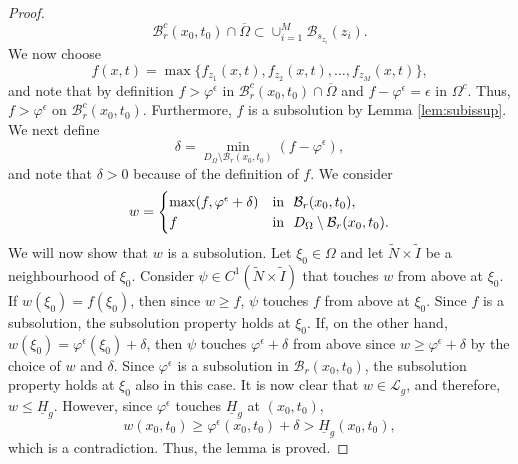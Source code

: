\documentclass[11pt]{article}
\providecommand{\Rnp}{D_{\Omega}}
\providecommand{\lps}{\underline{H}_g}
\providecommand{\lcg}{\mathcal{L}_g}
\numberwithin{equation}{section}
\theoremstyle{definition}
\begin{document}
\begin{proof}
    $$
    \mathcal{B}_{r}^c(x_0,t_0)  \cap \overline{\Omega} \subset \cup_{i=1}^M \mathcal{B}_{s_{z_i}}(z_i).
    $$
    We now choose
    \begin{equation*}
        f(x,t) = \max\{f_{z_1}(x,t), f_{z_2}(x,t), \hdots, f_{z_M}(x,t) \},
    \end{equation*}
    and note that by definition $f>\varphi^{\epsilon}$ in $\mathcal{B}_r^c(x_0,t_0) \cap \overline{\Omega}$ and $f-\varphi^{\epsilon}= \epsilon$ in $\Omega^c$. Thus, $f > \varphi^{\epsilon}$ on $\mathcal{B}_{r}^c(x_0,t_0)$. Furthermore, $f$ is a subsolution by Lemma \ref{lem:subissup}. We next define
    \begin{equation*}
        \delta = \min_{\Rnp \setminus \mathcal{B}_{r}(x_0,t_0)}(f-\varphi^{\epsilon}),
    \end{equation*}
    and note that $\delta >0$ because of the definition of $f$. We consider
    \begin{align*}
     w= \begin{cases}
            \max(f, \varphi^{\epsilon}+\delta) & \textup{in  } \ \mathcal{B}_r(x_0,t_0),  \\
            f & \textup{in  } \ \Rnp \setminus \mathcal{B}_r(x_0,t_0).
        \end{cases}
    \end{align*}
    We will now show that $w$ is a subsolution. Let $\xi_0 \in \Omega$ and let $\tilde{N} \times \tilde{I}$ be a neighbourhood of $\xi_0$. Consider $\psi \in C^1(\tilde{N} \times \tilde{I})$ that touches $w$ from above at $\xi_0$. If $w(\xi_0)=f(\xi_0)$, then since $w \geq f$, $\psi$ touches $f$ from above at $\xi_0$. Since $f$ is a subsolution, the subsolution property holds at $\xi_0$. If, on the other hand, $w(\xi_0)= \varphi^{\epsilon}(\xi_0)+\delta$, then $\psi$ touches $\varphi^{\epsilon} + \delta$ from above since $w \geq \varphi^{\epsilon}+\delta$ by the choice of $w$ and $\delta$. Since $\varphi^{\epsilon}$ is a subsolution in $\mathcal{B}_r(x_0,t_0)$, the subsolution property holds at $\xi_0$ also in this case. It is now clear that $w \in \lcg$, and therefore, $w \leq \lps$. However, since $\varphi^{\epsilon}$ touches $\lps$ at $(x_0,t_0)$,
    \begin{equation*}
        w(x_0,t_0) \geq \varphi^{\epsilon}(x_0,t_0)+\delta >\lps(x_0,t_0),
    \end{equation*}
    which is a contradiction. Thus, the lemma is proved.  
\end{proof}
\end{document}
